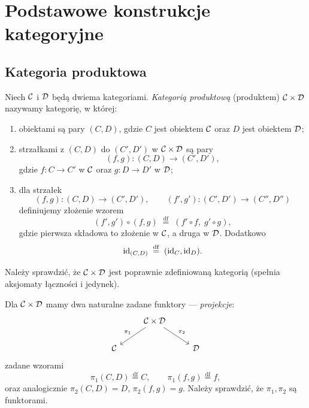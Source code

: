 \section{Podstawowe konstrukcje kategoryjne}

\subsection{Kategoria produktowa}

\begin{definicja}
Niech $\mathcal{C}$ i $\mathcal{D}$ będą dwiema kategoriami. \emph{Kategorią produktową} (produktem) $\mathcal{C} \times \mathcal{D}$ nazywamy kategorię, w której:
\begin{enumerate}
    \item[(a)] obiektami są pary $(C, D)$, gdzie $C$ jest obiektem $\mathcal{C}$ oraz $D$ jest obiektem $\mathcal{D}$;
    \item[(b)] strzałkami z $(C, D)$ do $(C', D')$ w $\mathcal{C} \times \mathcal{D}$ są pary
    \[
        (f, g) \colon (C, D) \longrightarrow (C', D'),
    \]
    gdzie $f \colon C \to C'$ w $\mathcal{C}$ oraz $g \colon D \to D'$ w $\mathcal{D}$;
    \item[(c)] dla strzałek
    \[
        (f, g) \colon (C, D) \to (C', D'), \qquad (f', g') \colon (C', D') \to (C'', D'')
    \]
    definiujemy złożenie wzorem
    \[
        (f', g') \circ (f, g) \;\stackrel{\mathrm{df}}{=}\; (f' \circ f,\; g' \circ g),
    \]
    gdzie pierwsza składowa to złożenie w $\mathcal{C}$, a druga w $\mathcal{D}$. Dodatkowo
    \[
        \mathrm{id}_{(C, D)} \;\stackrel{\mathrm{df}}{=}\; (\mathrm{id}_C, \mathrm{id}_D).
    \]
\end{enumerate}
\end{definicja}

\begin{uwaga}
Należy sprawdzić, że $\mathcal{C} \times \mathcal{D}$ jest poprawnie zdefiniowaną kategorią (spełnia aksjomaty łączności i jedynek).
\end{uwaga}

\begin{uwaga}
Dla $\mathcal{C} \times \mathcal{D}$ mamy dwa naturalne zadane funktory --- \emph{projekcje}:
\[
\begin{tikzcd}
& \Cat \times \D \arrow[dl, "\pi_1"'] \arrow[dr, "\pi_2"] & \\
\Cat & & \D
\end{tikzcd}
\]
zadane wzorami
\[
    \pi_1(C, D) \stackrel{\mathrm{df}}{=} C, \qquad \pi_1(f, g) \stackrel{\mathrm{df}}{=} f,
\]
oraz analogicznie $\pi_2(C, D) = D$, $\pi_2(f, g) = g$. Należy sprawdzić, że $\pi_1, \pi_2$ są funktorami.
\end{uwaga}

